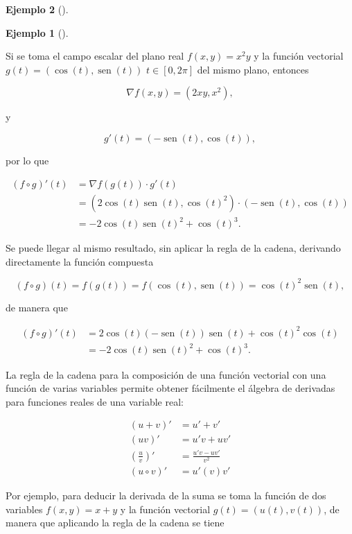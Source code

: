 \documentclass[
  a4paper,
]{scrreport}
\theoremstyle{definition}
\newtheorem{example}{Ejemplo}[chapter]
\theoremstyle{plain}
\theoremstyle{definition}
\theoremstyle{definition}
\theoremstyle{plain}
\theoremstyle{plain}
\theoremstyle{remark}
\begin{document}
\begin{example}[]
\begin{example}[]\protect\hypertarget{exm-regla-cadena}{}\label{exm-regla-cadena}

Si se toma el campo escalar del plano real \(f(x,y)=x^2y\) y la función
vectorial \(g(t)=(\cos(t),\operatorname{sen}(t))\) \(t\in [0,2\pi]\) del
mismo plano, entonces

\[
\nabla f(x,y) = (2xy, x^2),
\]

y

\[
g'(t) = (-\operatorname{sen}(t), \cos(t)),
\]

por lo que

\begin{align*}
(f\circ g)'(t) 
&= \nabla f(g(t))\cdot g'(t) \\
&= (2\cos(t)\operatorname{sen}(t),\cos(t)^2)\cdot (-\operatorname{sen}(t),\cos(t)) \\
&= -2\cos(t)\operatorname{sen}(t)^2+\cos(t)^3.
\end{align*}

Se puede llegar al mismo resultado, sin aplicar la regla de la cadena,
derivando directamente la función compuesta

\[
(f\circ g)(t) = f(g(t)) = f(\cos(t), \operatorname{sen}(t)) = \cos(t)^2\operatorname{sen}(t),
\]

de manera que

\begin{align*}
(f\circ g)'(t) 
&= 2\cos(t)(-\operatorname{sen}(t))\operatorname{sen}(t)+\cos(t)^2 \cos(t)\\
&= -2\cos(t)\operatorname{sen}(t)^2+\cos(t)^3.
\end{align*}

\end{example}

La regla de la cadena para la composición de una función vectorial con
una función de varias variables permite obtener fácilmente el álgebra de
derivadas para funciones reales de una variable real:

\[
\begin{aligned}
(u+v)' &= u'+v'\\
(uv)' &= u'v+uv'\\
\left(\frac{u}{v}\right)' &= \frac{u'v-uv'}{v^2}\\
(u\circ v)' &= u'(v)v'
\end{aligned}
\]

Por ejemplo, para deducir la derivada de la suma se toma la función de
dos variables \(f(x,y)=x+y\) y la función vectorial
\(g(t)=(u(t),v(t))\), de manera que aplicando la regla de la cadena se
tiene


\end{example}
\end{document}
